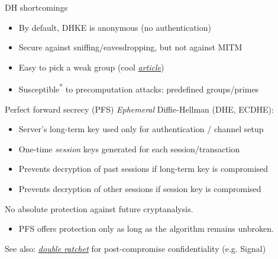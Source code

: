 \begin{frame}{DH shortcomings}
  \begin{itemize}[<+(1)->]
    \item By default, DHKE is anonymous (no authentication)
    \item Secure against sniffing/eavesdropping, but not against MITM
    \item Easy to pick a weak group (cool \href{https://weakdh.org/imperfect-forward-secrecy-ccs15.pdf}{\textit{article}})
    \item Susceptible\textsuperscript{*} to precomputation attacks: predefined groups/primes
  \end{itemize}
\end{frame}

\begin{frame}{Perfect forward secrecy (PFS)}
  \emph{Ephemeral} Diffie-Hellman (DHE, ECDHE):
  \begin{itemize}[<+->]
    \item Server's long-term key used only for authentication / channel setup
    \item One-time \emph{session} keys generated for each session/transaction
    \item Prevents decryption of past sessions if  long-term key is compromised
    \item Prevents decryption of other sessions if session key is compromised
  \end{itemize}

  \pause
  No absolute protection against future cryptanalysis.
  \begin{itemize}
    \item PFS offers protection only as long as the algorithm remains unbroken.
  \end{itemize}

  \pause
  See also: \emph{\href{https://en.wikipedia.org/wiki/Double_Ratchet_Algorithm}{double ratchet}} for post-compromise confidentiality (e.g. Signal)
\end{frame}

